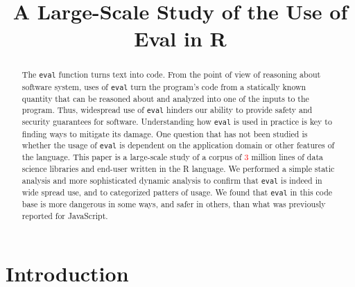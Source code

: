 \documentclass[conference]{IEEEtran}
\begin{document}
\title{A Large-Scale Study of the Use of Eval in R}
\author{\vspace{-.8cm}\IEEEauthorblockN{~}} %
\maketitle

\newcommand{\eg}{\emph{e.g.},\xspace}
\newcommand{\ie}{\emph{i.e.},\xspace}
\newcommand{\cf}{\emph{cf.}\xspace}

\newcommand{\eval}{\texttt{eval}\xspace}
\renewcommand{\c}[1]{\lstinline{#1}\xspace}
\newcommand{\miss}[1]{{\textcolor{red}{#1}}\xspace}

\begin{abstract}
  The \eval function turns text into code. From the point of view of
  reasoning about software system, uses of \eval turn the program's code
  from a statically known quantity that can be reasoned about and analyzed
  into one of the inputs to the program. Thus, widespread use of \eval
  hinders our ability to provide safety and security guarantees for
  software. Understanding how \eval is used in practice is key to finding
  ways to mitigate its damage. One question that has not been studied is
  whether the usage of \eval is dependent on the application domain or other
  features of the language. This paper is a large-scale study of a corpus of
  \miss{3} million lines of data science libraries and end-user written in
  the R language. We performed a simple static analysis and more
  sophisticated dynamic analysis to confirm that \eval is indeed in wide
  spread use, and to categorized patters of usage. We found that \eval in
  this code base is more dangerous in some ways, and safer in others, than
  what was previously reported for JavaScript.
\end{abstract}

\section{Introduction}
\end{document}
